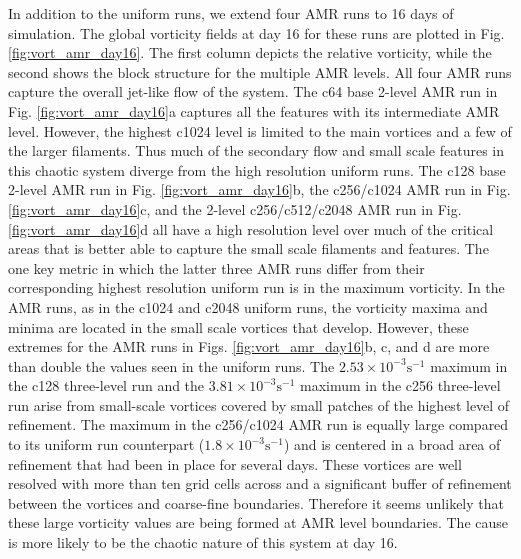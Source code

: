 In addition to the uniform runs, we extend four AMR runs to 16 days of simulation. 
The global vorticity fields at day 16 for these runs are plotted in 
Fig. \ref{fig:vort_amr_day16}. The first column depicts the relative vorticity,
while the second shows the block structure for the multiple AMR levels.
All four AMR runs capture the overall jet-like flow of the system.
The c64 base 2-level AMR run in Fig. \ref{fig:vort_amr_day16}a captures all the features
with its intermediate AMR level. However, the highest c1024 level is limited to the main vortices
and a few of the larger filaments. Thus much of the secondary flow and 
small scale features in this chaotic system diverge from 
the high resolution uniform runs. The c128 base
2-level AMR run in Fig. \ref{fig:vort_amr_day16}b, the c256/c1024 AMR run in Fig. 
\ref{fig:vort_amr_day16}c, and the 2-level c256/c512/c2048 AMR run in Fig.
\ref{fig:vort_amr_day16}d all have a high resolution level over much of the critical areas that
is better able to capture the small scale filaments and 
features. The one key metric in which the latter 
three AMR runs differ from their corresponding highest resolution
uniform run is in the maximum vorticity. In the AMR runs, as in the c1024 and c2048 
uniform runs, the vorticity maxima and minima are located in the small scale vortices
that develop. However, these extremes for the AMR runs in Figs. 
\ref{fig:vort_amr_day16}b, c, and d are more than double the values seen in the uniform runs.
The $2.53 \times 10^{-3}\mathrm{s}^{-1}$ maximum in the c128 three-level run and
the $3.81 \times 10^{-3}\mathrm{s}^{-1}$ maximum in the c256 three-level run arise
from small-scale vortices covered by small patches of the 
highest level of refinement.  The maximum in the c256/c1024 AMR run
is equally large compared to its uniform run counterpart  
($1.8 \times 10^{-3}\mathrm{s}^{-1}$) and is centered
in a broad area of refinement that had been in place for several days. These vortices
are well resolved with more than ten grid cells across and a significant buffer of refinement between the
vortices and coarse-fine boundaries. Therefore it
seems unlikely that these large vorticity values are being formed at AMR level boundaries.
The cause is more likely to be the chaotic nature of this system at day 16.

